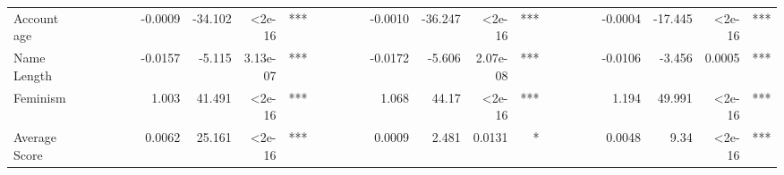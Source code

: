 \documentclass[letterpaper]{article}
\begin{document}
\begin{table}
\begin{threeparttable}
\begin{adjustbox}{max width=\textwidth}
\begin{tabular}{|p{4cm}|c|cccc|cccc|cccc|cccc|cccc|cccc|}
Account age &       & \multicolumn{1}{r|}{} & \multicolumn{1}{r|}{} & \multicolumn{1}{r|}{} &       & \multicolumn{1}{r|}{-0.0009} & \multicolumn{1}{r|}{-34.102} & \multicolumn{1}{r|}{\textless2e-16} & \multicolumn{1}{r|}{***} & \multicolumn{1}{r|}{} & \multicolumn{1}{r|}{} & \multicolumn{1}{r|}{} &       & \multicolumn{1}{r|}{-0.0010} & \multicolumn{1}{r|}{-36.247} & \multicolumn{1}{r|}{\textless2e-16} & \multicolumn{1}{r|}{***} & \multicolumn{1}{r|}{} & \multicolumn{1}{r|}{} & \multicolumn{1}{r|}{} &       & \multicolumn{1}{r|}{-0.0004} & \multicolumn{1}{r|}{-17.445} & \multicolumn{1}{r|}{\textless2e-16} & \multicolumn{1}{r|}{***} \\
Name Length &       & \multicolumn{1}{r|}{} & \multicolumn{1}{r|}{} & \multicolumn{1}{r|}{} &       & \multicolumn{1}{r|}{-0.0157} & \multicolumn{1}{r|}{-5.115} & \multicolumn{1}{r|}{3.13e-07} & \multicolumn{1}{r|}{***} & \multicolumn{1}{r|}{} & \multicolumn{1}{r|}{} & \multicolumn{1}{r|}{} &       & \multicolumn{1}{r|}{-0.0172} & \multicolumn{1}{r|}{-5.606} & \multicolumn{1}{r|}{2.07e-08} & \multicolumn{1}{r|}{***} & \multicolumn{1}{r|}{} & \multicolumn{1}{r|}{} & \multicolumn{1}{r|}{} &       & \multicolumn{1}{r|}{-0.0106} & \multicolumn{1}{r|}{-3.456} & \multicolumn{1}{r|}{0.0005} & \multicolumn{1}{r|}{***} \\
Feminism &       & \multicolumn{1}{r|}{} & \multicolumn{1}{r|}{} & \multicolumn{1}{r|}{} &       & \multicolumn{1}{r|}{1.003} & \multicolumn{1}{r|}{41.491} & \multicolumn{1}{r|}{\textless2e-16} & \multicolumn{1}{r|}{***} & \multicolumn{1}{r|}{} & \multicolumn{1}{r|}{} & \multicolumn{1}{r|}{} &       & \multicolumn{1}{r|}{1.068} & \multicolumn{1}{r|}{44.17} & \multicolumn{1}{r|}{\textless2e-16} & \multicolumn{1}{r|}{***} & \multicolumn{1}{r|}{} & \multicolumn{1}{r|}{} & \multicolumn{1}{r|}{} &       & \multicolumn{1}{r|}{1.194} & \multicolumn{1}{r|}{49.991} & \multicolumn{1}{r|}{\textless2e-16} & \multicolumn{1}{r|}{***} \\
Average Score &       & \multicolumn{1}{r|}{} & \multicolumn{1}{r|}{} & \multicolumn{1}{r|}{} &       & \multicolumn{1}{r|}{0.0062} & \multicolumn{1}{r|}{25.161} & \multicolumn{1}{r|}{\textless2e-16} & \multicolumn{1}{r|}{***} & \multicolumn{1}{r|}{} & \multicolumn{1}{r|}{} & \multicolumn{1}{r|}{} &       & \multicolumn{1}{r|}{0.0009} & \multicolumn{1}{r|}{2.481} & \multicolumn{1}{r|}{0.0131} & \multicolumn{1}{r|}{*} & \multicolumn{1}{r|}{} & \multicolumn{1}{r|}{} & \multicolumn{1}{r|}{} &       & \multicolumn{1}{r|}{0.0048} & \multicolumn{1}{r|}{9.34} & \multicolumn{1}{r|}{\textless2e-16} & \multicolumn{1}{r|}{***} \\

\end{tabular}
\end{adjustbox}
\end{threeparttable}
\end{table}
\end{document}
